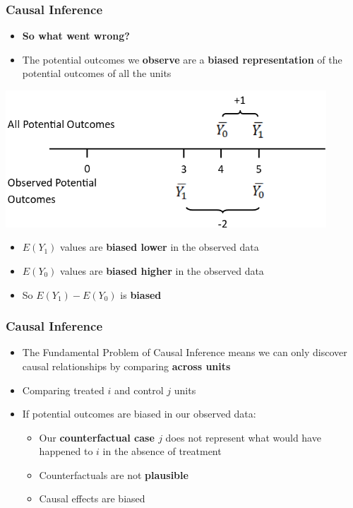 \documentclass[xcolor=x11names,compress]{beamer}\usepackage[]{graphicx}\usepackage[]{color}
\renewcommand{\(}{\begin{columns}}
\renewcommand{\)}{\end{columns}}
\newcommand{\<}[1]{\begin{column}{#1}}
\renewcommand{\>}{\end{column}}
\begin{document}
\begin{frame}
\frametitle{Causal Inference}
\begin{itemize}
\item \textbf{So what went wrong?}
\item The potential outcomes we \textbf{observe} are a \textbf{biased representation} of the potential outcomes of all the units
\end{itemize}
\includegraphics[width=0.9\textwidth]{PO_number_line_2.png}
\begin{itemize}
\item $E(Y_1)$ values are \textbf{biased lower} in the observed data
\pause
\item $E(Y_0)$ values are \textbf{biased higher} in the observed data
\pause
\item So $E(Y_1)-E(Y_0)$ is \textbf{biased}
\end{itemize}
\end{frame}

\begin{frame}
\frametitle{Causal Inference}
\begin{itemize}
\item The Fundamental Problem of Causal Inference means we can only discover causal relationships by comparing \textbf{across units}
\pause
\item Comparing treated $i$ and control $j$ units
\pause
\item If potential outcomes are biased in our observed data:
\pause
\begin{itemize}
\item Our \textbf{counterfactual case $j$} does not represent what would have happened to $i$ in the absence of treatment
\pause
\item Counterfactuals are not \textbf{plausible}
\pause
\item Causal effects are biased
\end{itemize}
\end{itemize}
\end{frame}
\end{document}
